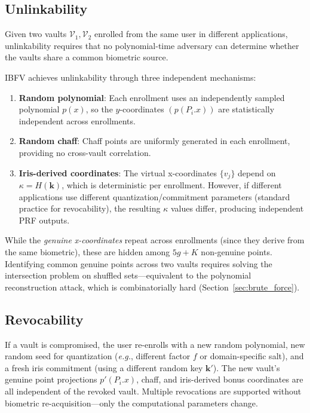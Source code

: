 \documentclass[3p,twocolumn]{elsarticle}
\newcommand{\IBFV}{\textsf{IBFV}}
\newcommand{\eg}{\textit{e.g.}}
\begin{document}
\subsection{Unlinkability}
\label{sec:unlinkability}

Given two vaults $\mathcal{V}_1, \mathcal{V}_2$ enrolled from the same user in different applications, unlinkability requires that no polynomial-time adversary can determine whether the vaults share a common biometric source.

\IBFV{} achieves unlinkability through three independent mechanisms:
\begin{enumerate}
    \item \textbf{Random polynomial}: Each enrollment uses an independently sampled polynomial $p(x)$, so the $y$-coordinates $(p(P_i.x))$ are statistically independent across enrollments.
    \item \textbf{Random chaff}: Chaff points are uniformly generated in each enrollment, providing no cross-vault correlation.
    \item \textbf{Iris-derived coordinates}: The virtual x-coordinates $\{v_j\}$ depend on $\kappa = H(\mathbf{k})$, which is deterministic per enrollment. However, if different applications use different quantization/commitment parameters (standard practice for revocability), the resulting $\kappa$ values differ, producing independent PRF outputs.
\end{enumerate}

\noindent While the \emph{genuine x-coordinates} repeat across enrollments (since they derive from the same biometric), these are hidden among $5g + K$ non-genuine points. Identifying common genuine points across two vaults requires solving the intersection problem on shuffled sets---equivalent to the polynomial reconstruction attack, which is combinatorially hard (Section~\ref{sec:brute_force}).

\subsection{Revocability}
\label{sec:revocability}

If a vault is compromised, the user re-enrolls with a new random polynomial, new random seed for quantization (\eg{}, different factor $f$ or domain-specific salt), and a fresh iris commitment (using a different random key $\mathbf{k}'$). The new vault's genuine point projections $p'(P_i.x)$, chaff, and iris-derived bonus coordinates are all independent of the revoked vault. Multiple revocations are supported without biometric re-acquisition---only the computational parameters change.
\end{document}
